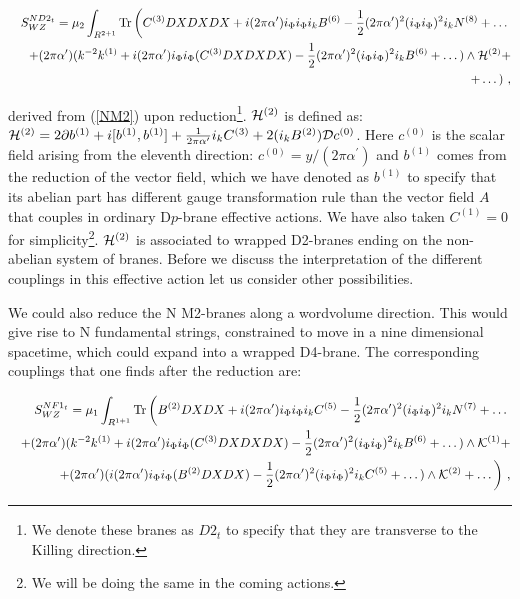 \documentclass[12pt,a4paper]{article}
\begin{document}
\begin{eqnarray}
\label{actiontD2}
&&S^{ND2_t}_{WZ}=\mu_2\int_{R^{2+1}}{\rm Tr}\left(C^{(3)}DXDXDX+
i(2\pi\alpha^\prime)i_\Phi i_\Phi i_k B^{(6)}-\frac12 
(2\pi\alpha^\prime)^2 (i_\Phi i_\Phi)^2 i_k N^{(8)}+\dots
\right.\nonumber\\
&&+(2\pi\alpha^\prime)(k^{-2}k^{(1)}+i(2\pi\alpha^\prime)
i_\Phi i_\Phi (C^{(3)}DXDXDX)-\frac12 (2\pi\alpha^\prime)^2
(i_\Phi i_\Phi)^2 i_k B^{(6)}+\dots)\wedge {\cal H}^{(2)}+
\nonumber\\
&&\left.+\dots\right)\, ,
\end{eqnarray}

\noindent derived from (\ref{NM2}) upon reduction\footnote{We denote
these branes as $D2_t$ to specify that they are transverse to the
Killing direction.}. ${\cal H}^{(2)}$ is defined as:
${\cal H}^{(2)}=2\partial b^{(1)}+i[b^{(1)},b^{(1)}]+
\frac{1}{2\pi\alpha^\prime}i_k C^{(3)}
+2 (i_k B^{(2)}){\cal D}c^{(0)}$. Here $c^{(0)}$ is
the scalar field arising from the eleventh direction:
$c^{(0)}=y/(2\pi\alpha^\prime)$ and $b^{(1)}$ comes from the
reduction of the vector field, which we have denoted as $b^{(1)}$
to specify that its abelian part has different gauge transformation
rule than the vector field $A$ that couples in ordinary D$p$-brane
effective actions. We have also taken $C^{(1)}=0$ for 
simplicity\footnote{We will be doing the same in the coming actions.}.
${\cal H}^{(2)}$ is associated to wrapped D2-branes ending on the
non-abelian system of branes.
Before we discuss the interpretation
of the different couplings in this effective action let us consider
other possibilities.

We could also reduce the N M2-branes along a
wordvolume direction. This would give rise to N fundamental strings,
constrained to move in a nine dimensional spacetime, which could
expand into a
wrapped D4-brane. The corresponding
couplings that one finds after the reduction are:

\begin{eqnarray}
\label{actiontF1}
&&S^{NF1_t}_{WZ}=\mu_1\int_{R^{1+1}}{\rm Tr}\left(B^{(2)}DXDX+
i(2\pi\alpha^\prime)i_\Phi i_\Phi i_k C^{(5)}-\frac12 
(2\pi\alpha^\prime)^2 (i_\Phi i_\Phi)^2 i_k N^{(7)}+\dots
\right.\nonumber\\
&&+(2\pi\alpha^\prime)(k^{-2}k^{(1)}+i(2\pi\alpha^\prime)
i_\Phi i_\Phi (C^{(3)}DXDXDX)-\frac12 (2\pi\alpha^\prime)^2
(i_\Phi i_\Phi)^2 i_k B^{(6)}+\dots)\wedge {\cal K}^{(1)}+\nonumber\\
&&\left. +(2\pi\alpha^\prime)(i(2\pi\alpha^\prime)
i_\Phi i_\Phi (B^{(2)}DXDX)-\frac12 (2\pi\alpha^\prime)^2
(i_\Phi i_\Phi)^2 i_k C^{(5)}+\dots)\wedge {\cal K}^{(2)}
+\dots\right)\, ,\nonumber\\
\end{eqnarray}
\end{document}
